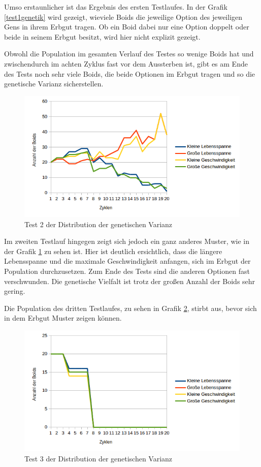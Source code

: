 \documentclass[draft=false
              ,paper=a4
              ,twoside=false
              ,fontsize=11pt
              ,headsepline
              ,BCOR10mm
              ,DIV11
              ,bibtotoc
              ,liststotoc
              ]{scrbook}
\begin{document}
Umso erstaunlicher ist das Ergebnis des ersten Testlaufes. In der Grafik \ref{test1genetik} wird gezeigt, wieviele Boids die jeweilige Option des jeweiligen Gens in ihrem Erbgut tragen. Ob ein Boid dabei nur eine Option doppelt oder beide in seinem Erbgut besitzt, wird hier nicht explizit gezeigt.

Obwohl die Population im gesamten Verlauf des Testes so wenige Boids hat und zwischendurch im achten Zyklus fast vor dem Aussterben ist, gibt es am Ende des Tests noch sehr viele Boids, die beide Optionen im Erbgut tragen und so die genetische Varianz sicherstellen.

\begin{figure}[!h]
\centering
\includegraphics[scale=0.80]{project/Test2-Genetik.png}
\caption{Test 2 der Distribution der genetischen Varianz}
\label{test2genetik}
\end{figure}

Im zweiten Testlauf hingegen zeigt sich jedoch ein ganz anderes Muster, wie in der Grafik \ref{test2genetik} zu sehen ist. Hier ist deutlich ersichtlich, dass die längere Lebensspanne und die maximale Geschwindigkeit anfangen, sich im Erbgut der Population durchzusetzen. Zum Ende des Tests sind die anderen Optionen fast verschwunden. Die genetische Vielfalt ist trotz der großen Anzahl der Boids sehr gering.

Die Population des dritten Testlaufes, zu sehen in Grafik \ref{test3genetik}, stirbt aus, bevor sich in dem Erbgut Muster zeigen können.

\begin{figure}[!h]
\centering
\includegraphics[scale=0.80]{project/Test3-Genetik.png}
\caption{Test 3 der Distribution der genetischen Varianz}
\label{test3genetik}
\end{figure}
\end{document}

